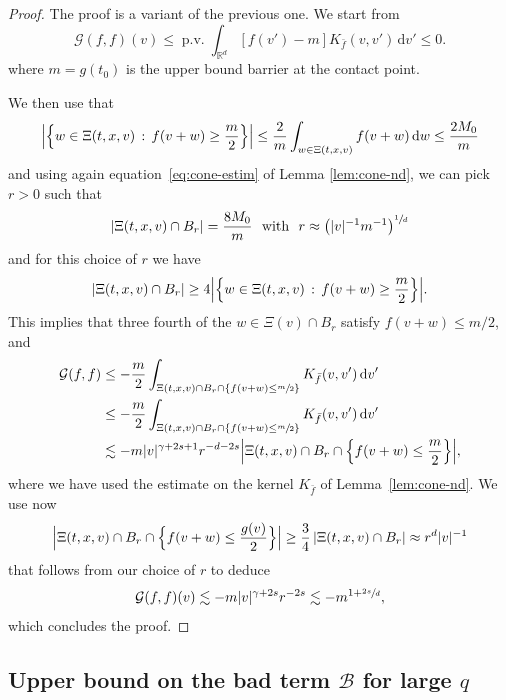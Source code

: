 \documentclass[JEP,XML,SOM,Unicode,NoFloatCountersInSection]{cedram}
\theoremstyle{plain}
\theoremstyle{definition}
\numberwithin{equation}{section}
\newcommand{\R}{\mathbb R}
\newcommand{\dd} {\, \mathrm{d}}
\DeclareMathOperator{\PV}{p.v.}
\begin{document}
\begin{proof}
The proof is a variant of the previous one. We start from
\begin{equation*}
\mathcal{G}(f,f)(v) \le \PV \int_{\R^d} \left[f(v')-m\right] K_{\bar f}(v,v') \dd
v' \le 0.
\end{equation*}
where $m=g(t_0)$ is the upper bound barrier at the contact point.

We then use that
\[
\Bigl|\Bigl\{ w \in \Xi(t,x,v) \, : \, f(v+w) \ge \frac{m}{2}
\Bigr\}\Bigr| \le \frac2{m} \int_{w \in \Xi(t,x,v)} f(v+w) \dd w \le
\frac{2M_0}{m}
\]
and using again equation~\eqref{eq:cone-estim} of Lemma
\ref{lem:cone-nd}, we can pick $r>0$ such that
\[
\left|\Xi(t,x,v) \cap B_r \right| = \frac{8M_0}{m} \ \mbox{ with } \ r \approx
\left(|v|^{-1} m^{-1}\right)^{\sfrac1d}
\]
and for this choice of $r$ we have
\[
\left|\Xi(t,x,v) \cap B_r \right| \ge 4 \Bigl|\Bigl\{ w \in \Xi(t,x,v) \, :
\, f(v+w) \ge \frac{m}{2} \Bigr\}\Bigr|.
\]
This implies that three fourth of the $w \in \Xi(v) \cap B_r$ satisfy
$ f(v+w) \le m/2$, and
\begin{align*}
\mathcal G(f,f) & \leq - \frac{m}{2} \int_{\Xi(t,x,v) \cap B_r \cap \left\{f(v+w) \le \sfrac{m}{2}\right\}}
K_{\bar f}(v,v') \dd v' \\
&\leq -\frac{m}{2} \int_{\Xi(t,x,v) \cap B_r \cap \left\{f(v+w) \le \sfrac{m}{2}\right\} } K_{\bar f}(v,v') \dd v' \\
&\lesssim - m |v|^{\gamma+2s+1} r^{-d-2s} \Bigl|\Xi(t,x,v) \cap B_r \cap
\Bigl\{f(v+w) \le \frac{m}{2}\Bigr\}\Bigr|,
\end{align*}
where we have used the estimate on the kernel $K_{\bar f}$ of
Lemma~\ref{lem:cone-nd}. We use now
\[
\Bigl|\Xi(t,x,v) \cap B_r \cap \Bigl\{f(v+w) \le \frac{g(v)}{2} \Bigr\}\Bigr| \ge \frac34\, |\Xi(t,x,v) \cap
B_r| \approx r^d |v|^{-1}
\]
that follows from our choice of $r$ to deduce
\begin{align*}
\mathcal G(f,f)(v) \lesssim - m |v|^{\gamma+2s} r^{-2s} \lesssim
- m^{1+\sfrac{2s}{d}},
\end{align*}
which concludes the proof.
\end{proof}

\subsection{Upper bound on the bad term $\mathcal B$ for large $q$}
\end{document}
